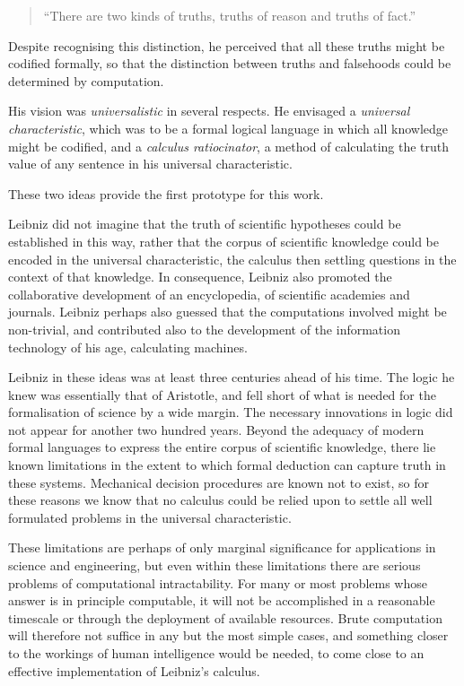 \begin{quote}
``There are two kinds of truths, truths of reason and truths of fact.''
\end{quote}

Despite recognising this distinction, he perceived that all these
truths might be codified formally, so that the distinction between
truths and falsehoods could be determined by computation. 

His vision was \emph{universalistic} in several respects.
He envisaged a \emph{universal
  characteristic}, which was to be a
formal logical language in which all knowledge might be codified, and
a \emph{calculus ratiocinator}, a method
of calculating the truth value of any sentence in his universal
characteristic. 

These two ideas provide the first prototype for this work.

Leibniz did not imagine that the truth of scientific hypotheses could
be established in this way, rather that the corpus of scientific
knowledge could be encoded in the universal characteristic, the
calculus then settling questions in the context of that knowledge. 
In consequence, Leibniz also promoted the collaborative development of
an encyclopedia, of scientific academies and journals. 
Leibniz perhaps also guessed that the computations involved might be
non-trivial, and contributed also to the development of the
information technology of his age, calculating machines. 

Leibniz in these ideas was at least three centuries ahead of his time.
The logic he knew was essentially that of Aristotle, and fell short of
what is needed for the formalisation of science by a wide margin. 
The necessary innovations in logic did not appear for another two
hundred years. 
Beyond the adequacy of modern formal languages to express the entire
corpus of scientific knowledge, there lie known limitations in the
extent to which formal deduction can capture truth in these systems. 
Mechanical decision procedures are known not to exist, so for these
reasons we know that no calculus could be relied upon to settle all
well formulated problems in the universal characteristic. 

These limitations are perhaps of only marginal significance for
applications in science and engineering, but even within these
limitations there are serious problems of computational
intractability. 
For many or most problems whose answer is in principle computable, it
will not be accomplished in a reasonable timescale or through the
deployment of available resources. 
Brute computation will therefore not suffice in any but the most
simple cases, and something closer to the workings of human
intelligence would be needed, to come close to an effective
implementation of Leibniz's calculus. 

